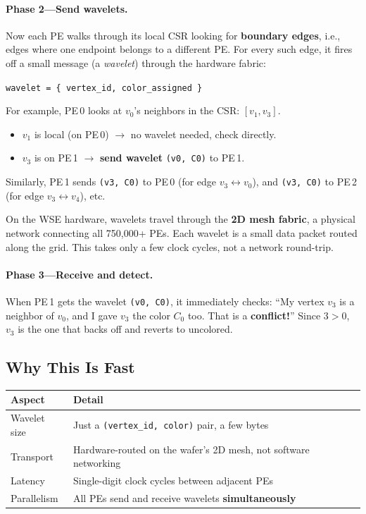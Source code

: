 \documentclass[11pt,letterpaper]{article}
\begin{document}
\paragraph{Phase 2---Send wavelets.}
Now each PE walks through its local CSR looking for \textbf{boundary edges}, i.e., edges where one endpoint belongs to a different PE. For every such edge, it fires off a small message (a \emph{wavelet}) through the hardware fabric:

\begin{center}
\texttt{wavelet = \{ vertex\_id, color\_assigned \}}
\end{center}

For example, PE\,0 looks at $v_0$'s neighbors in the CSR: $[v_1, v_3]$.
\begin{itemize}[nosep]
  \item $v_1$ is local (on PE\,0) $\rightarrow$ no wavelet needed, check directly.
  \item $v_3$ is on PE\,1 $\rightarrow$ \textbf{send wavelet} \texttt{(v0, C0)} to PE\,1.
\end{itemize}

Similarly, PE\,1 sends \texttt{(v3, C0)} to PE\,0 (for edge $v_3 \leftrightarrow v_0$), and \texttt{(v3, C0)} to PE\,2 (for edge $v_3 \leftrightarrow v_4$), etc.

On the WSE hardware, wavelets travel through the \textbf{2D mesh fabric}, a physical network connecting all 750,000+ PEs. Each wavelet is a small data packet routed along the grid. This takes only a few clock cycles, not a network round-trip.

\paragraph{Phase 3---Receive and detect.}
When PE\,1 gets the wavelet \texttt{(v0, C0)}, it immediately checks: ``My vertex $v_3$ is a neighbor of $v_0$, and I gave $v_3$ the color $C_0$ too. That is a \textbf{conflict!}'' Since $3 > 0$, $v_3$ is the one that backs off and reverts to uncolored.

\subsection{Why This Is Fast}

\begin{center}
\renewcommand{\arraystretch}{1.3}
\begin{tabular}{>{\raggedright}p{3.4cm} p{9cm}}
\toprule
\textbf{Aspect} & \textbf{Detail} \\
\midrule
Wavelet size & Just a \texttt{(vertex\_id, color)} pair, a few bytes \\
Transport & Hardware-routed on the wafer's 2D mesh, not software networking \\
Latency & Single-digit clock cycles between adjacent PEs \\
Parallelism & All PEs send and receive wavelets \textbf{simultaneously} \\
\bottomrule
\end{tabular}
\end{center}
\end{document}
